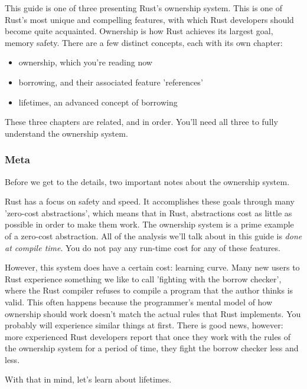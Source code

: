 This guide is one of three presenting Rust's ownership system. This is one of Rust's most unique and compelling features, with 
which Rust developers should become quite acquainted. Ownership is how Rust achieves its largest goal, memory safety. There are 
a few distinct concepts, each with its own chapter:

\begin{itemize}
  \item{ownership, which you're reading now}
  \item{borrowing, and their associated feature 'references'}
  \item{lifetimes, an advanced concept of borrowing}
\end{itemize}

These three chapters are related, and in order. You'll need all three to fully understand the ownership system.

\subsubsection*{Meta}

Before we get to the details, two important notes about the ownership system.

\blank

Rust has a focus on safety and speed. It accomplishes these goals through many 'zero-cost abstractions', which means that in 
Rust, abstractions cost as little as possible in order to make them work. The ownership system is a prime example of a zero-cost
abstraction. All of the analysis we'll talk about in this guide is \emph{done at compile time}. You do not pay any run-time cost 
for any of these features.

\blank

However, this system does have a certain cost: learning curve. Many new users to Rust experience something we like to call 
'fighting with the borrow checker', where the Rust compiler refuses to compile a program that the author thinks is valid. 
This often happens because the programmer's mental model of how ownership should work doesn't match the actual rules that Rust 
implements. You probably will experience similar things at first. There is good news, however: more experienced Rust developers 
report that once they work with the rules of the ownership system for a period of time, they fight the borrow checker less and less.

\blank

With that in mind, let's learn about lifetimes.

